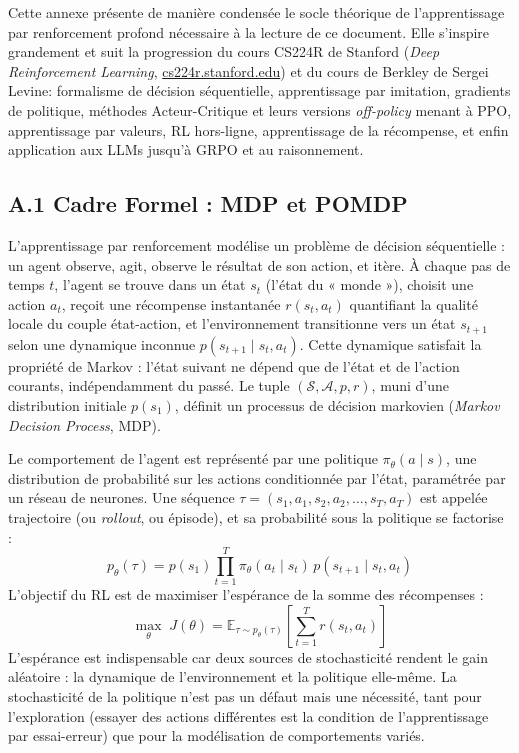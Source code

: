 \documentclass[11pt,a4paper]{article}
\begin{document}
Cette annexe présente de manière condensée le socle théorique de l'apprentissage par renforcement profond nécessaire à la lecture de ce document. Elle s'inspire grandement et suit la progression du cours CS224R de Stanford (\emph{Deep Reinforcement Learning}, \href{https://cs224r.stanford.edu/}{cs224r.stanford.edu}) et du cours de Berkley de Sergei Levine: formalisme de décision séquentielle, apprentissage par imitation, gradients de politique, méthodes Acteur-Critique et leurs versions \emph{off-policy} menant à PPO, apprentissage par valeurs, RL hors-ligne, apprentissage de la récompense, et enfin application aux LLMs jusqu'à GRPO et au raisonnement.

\subsection*{A.1 Cadre Formel : MDP et POMDP}
L'apprentissage par renforcement modélise un problème de décision séquentielle : un agent observe, agit, observe le résultat de son action, et itère. À chaque pas de temps $t$, l'agent se trouve dans un état $s_t$ (l'état du « monde »), choisit une action $a_t$, reçoit une récompense instantanée $r(s_t, a_t)$ quantifiant la qualité locale du couple état-action, et l'environnement transitionne vers un état $s_{t+1}$ selon une dynamique inconnue $p(s_{t+1} \mid s_t, a_t)$. Cette dynamique satisfait la propriété de Markov : l'état suivant ne dépend que de l'état et de l'action courants, indépendamment du passé. Le tuple $(\mathcal{S}, \mathcal{A}, p, r)$, muni d'une distribution initiale $p(s_1)$, définit un processus de décision markovien (\emph{Markov Decision Process}, MDP).

Le comportement de l'agent est représenté par une politique $\pi_\theta(a \mid s)$, une distribution de probabilité sur les actions conditionnée par l'état, paramétrée par un réseau de neurones. Une séquence $\tau = (s_1, a_1, s_2, a_2, \dots, s_T, a_T)$ est appelée trajectoire (ou \emph{rollout}, ou épisode), et sa probabilité sous la politique se factorise :
\begin{equation}
p_\theta(\tau) = p(s_1) \prod_{t=1}^{T} \pi_\theta(a_t \mid s_t)\, p(s_{t+1} \mid s_t, a_t)
\end{equation}
L'objectif du RL est de maximiser l'espérance de la somme des récompenses :
\begin{equation}
\max_\theta \; J(\theta) = \mathbb{E}_{\tau \sim p_\theta(\tau)} \left[ \sum_{t=1}^{T} r(s_t, a_t) \right]
\label{eq:rl_objective}
\end{equation}
L'espérance est indispensable car deux sources de stochasticité rendent le gain aléatoire : la dynamique de l'environnement et la politique elle-même. La stochasticité de la politique n'est pas un défaut mais une nécessité, tant pour l'exploration (essayer des actions différentes est la condition de l'apprentissage par essai-erreur) que pour la modélisation de comportements variés.
\end{document}
